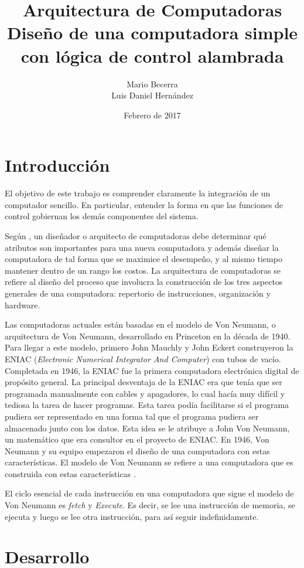 \documentclass{article}
\title{\textbf{Arquitectura de Computadoras} \\ 
  Diseño de	una computadora simple con lógica de control alambrada}
\author{Mario Becerra \\ Luis Daniel Hernández}
\date{Febrero de 2017}
\begin{document}
\maketitle


\section{Introducción}

El objetivo de este trabajo es comprender claramente la integración de un computador sencillo.  En particular, entender la forma en que las funciones de control gobiernan los demás componentes del sistema. 

Según \cite{Hennessy_2006}, un diseñador o arquitecto de computadoras debe determinar qué atributos son importantes para una nueva computadora y además diseñar la computadora de tal forma que se maximice el desempeño, y al mismo tiempo mantener dentro de un rango los costos. La arquitectura de computadoras se refiere al diseño del proceso que involucra la construcción de los tres aspectos generales de una computadora: repertorio de instrucciones, organización y hardware.

Las computadoras actuales están basadas en el modelo de Von Neumann, o arquitectura de Von Neumann, desarrollado en Princeton en la década de 1940. Para llegar a este modelo, primero John Mauchly y John Eckert construyeron la ENIAC (\textit{Electronic Numerical Integrator And Computer}) con tubos de vacío. Completada en 1946, la ENIAC fue la primera computadora electrónica digital de propósito general. La principal desventaja de la ENIAC era que tenía que ser programada manualmente con cables y apagadores, lo cual hacía muy difícil y tediosa la tarea de hacer programas. Esta tarea podía facilitarse si el programa pudiera ser representado en una forma tal que el programa pudiera ser almacenado junto con los datos. Esta idea se le atribuye a John Von Neumann, un matemático que era consultor en el proyecto de ENIAC. En 1946, Von Neumann y su equipo empezaron el diseño de una computadora con estas características. El modelo de Von Neumann se refiere a una computadora que es construida con estas características \cite{Stallings:2005:COA:1206425}.

El ciclo esencial de cada instrucción en una computadora que sigue el modelo de Von Neumann es \textit{fetch} y \textit{Execute}. Es decir, se lee una instrucción de memoria, se ejecuta y luego se lee otra instrucción, para así seguir indefinidamente.

\section{Desarrollo}
\end{document}

